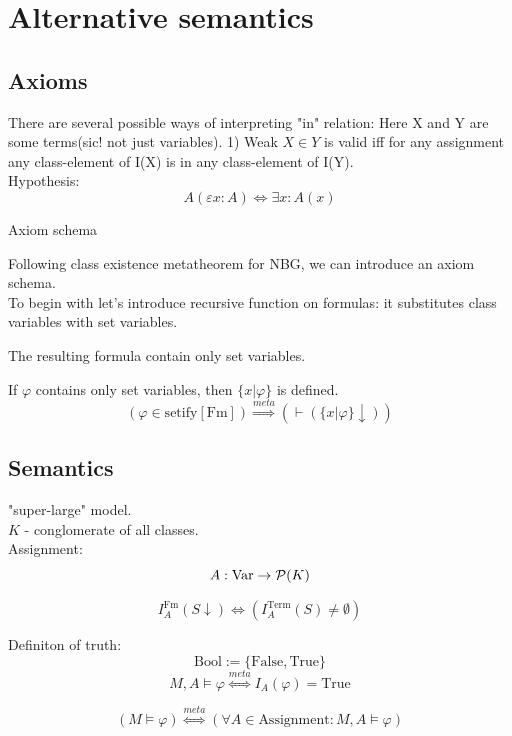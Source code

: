 \def\topic{Alternative semantics}

\section{Alternative semantics}
\subsection{Axioms}
There are several possible ways of interpreting "in" relation: 
Here X and Y are some terms(sic! not just variables).
1) Weak
$X\in Y$ is valid iff for any assignment any class-element of I(X) is in any class-element of I(Y).\\

Hypothesis:
\[A(\varepsilon x: A)\iff \exists x: A(x)\]

Axiom schema

Following class existence metatheorem for NBG, we can introduce an axiom schema.\\
To begin with let's introduce recursive function on formulas: it substitutes class variables with set variables.

The resulting formula contain only set variables.

If $\varphi$ contains only set variables, then 
$\{x | \varphi\}$ is defined.
\[(\varphi\in\mathrm{setify}[\mathrm{Fm}])\stackrel{meta}{\Longrightarrow} ( \vdash (\{x | \varphi\}\downarrow)) \]

\subsection{Semantics}
"super-large" model.\\
$K$ - conglomerate of all classes.\\

Assignment:\\
\[A:\mbox{Var}\to \mathcal{P}(K)\]

\[I^{\mathrm{Fm}}_A(S\downarrow) \iff (I^{\mathrm{Term}}_A(S)\neq\emptyset)\]

Definiton of truth:
\[\mbox{Bool} := \{\mbox{False}, \mbox{True}\}\]
\[M,A\vDash \varphi \stackrel{meta}{\Longleftrightarrow} I_A(\varphi)=\mbox{True}\]

\[(M\vDash \varphi) \stackrel{meta}{\Longleftrightarrow} (\forall A\in \mbox{Assignment}: M,A\vDash \varphi)\]


%


